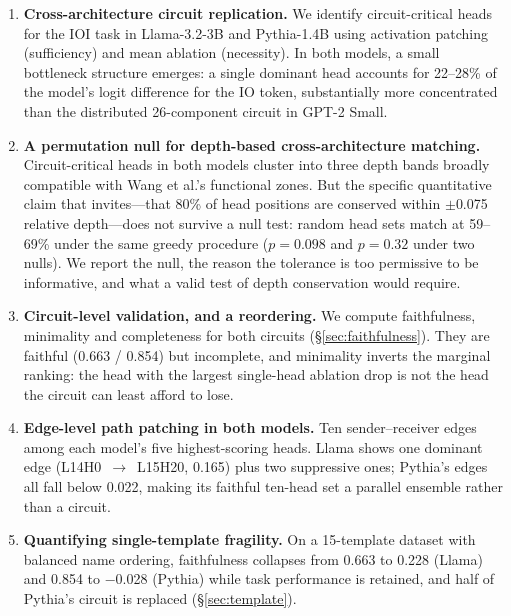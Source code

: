 \documentclass[11pt,a4paper]{article}
\begin{document}
\begin{enumerate}
  \item \textbf{Cross-architecture circuit replication.}  We identify circuit-critical
    heads for the IOI task in Llama-3.2-3B and Pythia-1.4B using activation patching
    (sufficiency) and mean ablation (necessity). In both models, a small bottleneck
    structure emerges: a single dominant head accounts for 22--28\% of the model's
    logit difference for the IO token, substantially more concentrated than the
    distributed 26-component circuit in GPT-2 Small.

  \item \textbf{A permutation null for depth-based cross-architecture matching.}
    Circuit-critical heads in both models cluster into three depth bands broadly
    compatible with Wang et al.'s functional zones. But the specific quantitative
    claim that invites---that 80\% of head positions are conserved within $\pm$0.075
    relative depth---does not survive a null test: random head sets match at
    59--69\% under the same greedy procedure ($p = 0.098$ and $p = 0.32$ under two
    nulls). We report the null, the reason the tolerance is too permissive to be
    informative, and what a valid test of depth conservation would require.

  \item \textbf{Circuit-level validation, and a reordering.}  We compute faithfulness,
    minimality and completeness for both circuits (\S\ref{sec:faithfulness}). They are
    faithful (0.663 / 0.854) but incomplete, and minimality inverts the marginal ranking:
    the head with the largest single-head ablation drop is not the head the circuit can
    least afford to lose.

  \item \textbf{Edge-level path patching in both models.}  Ten sender--receiver edges
    among each model's five highest-scoring heads. Llama shows one dominant edge
    (L14H0~$\to$~L15H20, 0.165) plus two suppressive ones; Pythia's edges all fall below
    0.022, making its faithful ten-head set a parallel ensemble rather than a circuit.

  \item \textbf{Quantifying single-template fragility.}  On a 15-template dataset with
    balanced name ordering, faithfulness collapses from 0.663 to 0.228 (Llama) and 0.854
    to $-$0.028 (Pythia) while task performance is retained, and half of Pythia's circuit
    is replaced (\S\ref{sec:template}).


\end{enumerate}
\end{document}
